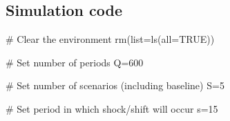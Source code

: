 \documentclass[
  letterpaper,
  DIV=11,
  numbers=noendperiod]{scrreprt}
\newenvironment{Shaded}{\begin{snugshade}}{\end{snugshade}}
\newcommand{\AttributeTok}[1]{\textcolor[rgb]{0.40,0.45,0.13}{#1}}
\newcommand{\CommentTok}[1]{\textcolor[rgb]{0.37,0.37,0.37}{#1}}
\newcommand{\ConstantTok}[1]{\textcolor[rgb]{0.56,0.35,0.01}{#1}}
\newcommand{\DecValTok}[1]{\textcolor[rgb]{0.68,0.00,0.00}{#1}}
\newcommand{\FunctionTok}[1]{\textcolor[rgb]{0.28,0.35,0.67}{#1}}
\newcommand{\NormalTok}[1]{\textcolor[rgb]{0.00,0.23,0.31}{#1}}
\newcommand{\OtherTok}[1]{\textcolor[rgb]{0.00,0.23,0.31}{#1}}
\begin{document}
\subsection{Simulation code}\label{simulation-code-11}

\begin{Shaded}
\begin{Highlighting}[]
\CommentTok{\# Clear the environment}
\FunctionTok{rm}\NormalTok{(}\AttributeTok{list=}\FunctionTok{ls}\NormalTok{(}\AttributeTok{all=}\ConstantTok{TRUE}\NormalTok{))}

\CommentTok{\# Set number of periods}
\NormalTok{Q}\OtherTok{=}\DecValTok{600}

\CommentTok{\# Set number of scenarios (including baseline)}
\NormalTok{S}\OtherTok{=}\DecValTok{5}

\CommentTok{\# Set period in which shock/shift will occur}
\NormalTok{s}\OtherTok{=}\DecValTok{15}


\end{Highlighting}
\end{Shaded}
\end{document}
